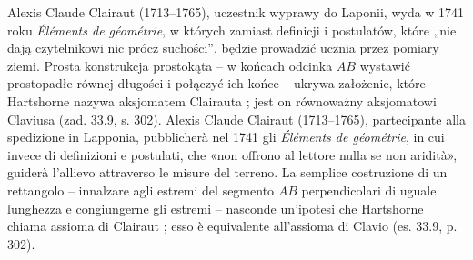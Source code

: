 Alexis Claude Clairaut (1713--1765), uczestnik wyprawy do Laponii, wyda w 1741 roku \emph{Éléments de géométrie}, w których zamiast definicji i postulatów, które „nie dają czytelnikowi nic prócz suchości'', będzie prowadzić ucznia przez pomiary ziemi. %
Prosta konstrukcja prostokąta -- w końcach odcinka $AB$ wystawić prostopadłe równej długości i połączyć ich końce -- ukrywa założenie, które Hartshorne nazywa aksjomatem Clairauta \cite[s. 299]{hartshorne_2000}; jest on równoważny aksjomatowi Claviusa (zad. 33.9, s. 302). %
Alexis Claude Clairaut (1713--1765), partecipante alla spedizione in Lapponia, pubblicherà nel 1741 gli \emph{Éléments de géométrie}, in cui invece di definizioni e postulati, che «non offrono al lettore nulla se non aridità», guiderà l'allievo attraverso le misure del terreno. %
La semplice costruzione di un rettangolo -- innalzare agli estremi del segmento $AB$ perpendicolari di uguale lunghezza e congiungerne gli estremi -- nasconde un'ipotesi che Hartshorne chiama assioma di Clairaut \cite[p. 299]{hartshorne_2000}; esso è equivalente all'assioma di Clavio (es. 33.9, p. 302). %
%


